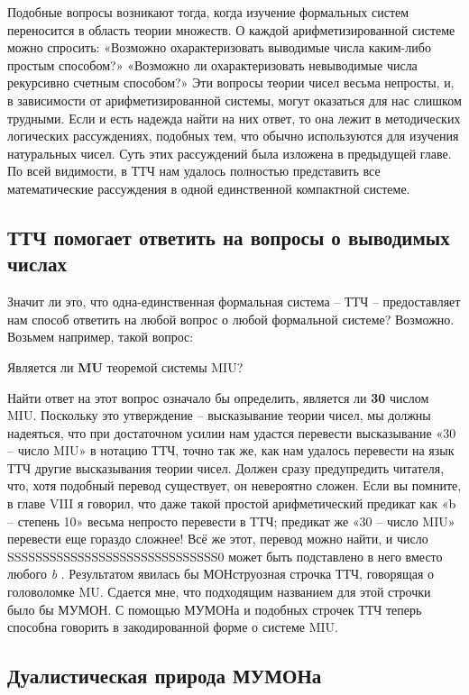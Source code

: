 \documentclass[../main.tex]{subfiles}
\begin{document}
Подобные вопросы возникают тогда, когда изучение формальных систем переносится в область теории множеств. О каждой арифметизированной системе можно спросить: «Возможно охарактеризовать выводимые числа каким-либо простым способом?» «Возможно ли охарактеризовать невыводимые числа рекурсивно счетным способом?» Эти вопросы теории чисел весьма непросты, и, в зависимости от арифметизированной системы, могут оказаться для нас слишком трудными. Если и есть надежда найти на них ответ, то она лежит в методических логических рассуждениях, подобных тем, что обычно используются для изучения натуральных чисел. Суть этих рассуждений была изложена в предыдущей главе. По всей видимости, в ТТЧ нам удалось полностью представить все математические рассуждения в одной единственной компактной системе.


\subsection{ТТЧ помогает ответить на вопросы о выводимых числах}

Значит ли это, что одна-единственная формальная система \--- ТТЧ \--- предоставляет нам способ ответить на любой вопрос о любой формальной системе? Возможно. Возьмем например, такой вопрос:

Является ли \textbf{MU} теоремой системы MIU?

Найти ответ на этот вопрос означало бы определить, является ли \textbf{30} числом MIU\@. Поскольку это утверждение \--- высказывание теории чисел, мы должны надеяться, что при достаточном усилии нам удастся перевести высказывание «30 \--- число MIU» в нотацию ТТЧ, точно так же, как нам удалось перевести на язык ТТЧ другие высказывания теории чисел. Должен сразу предупредить читателя, что, хотя подобный перевод существует, он невероятно сложен. Если вы помните, в главе VIII я говорил, что даже такой простой арифметический предикат как «b \--- степень 10» весьма непросто перевести в ТТЧ; предикат же «30 \--- число MIU» перевести еще гораздо сложнее! Всё же этот, перевод можно найти, и число SSSSSSSSSSSSSSSSSSSSSSSSSSSSSS0 может быть подставлено в него вместо любого \emph{b} . Результатом явилась бы МОНструозная строчка ТТЧ, говорящая о головоломке MU\@. Сдается мне, что подходящим названием для этой строчки было бы МУМОН\@. С помощью МУМОНа и подобных строчек ТТЧ теперь способна говорить в закодированной форме о системе MIU.


\subsection{Дуалистическая природа МУМОНа}
\end{document}
